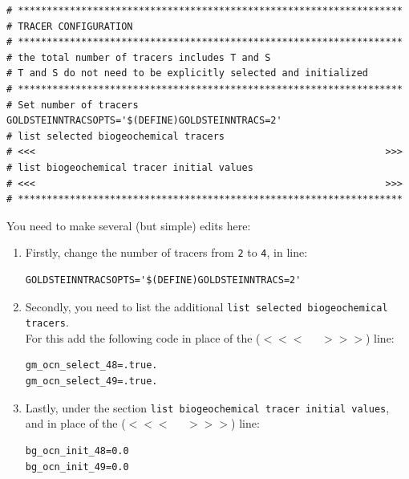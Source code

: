 \documentclass[11pt,fleqn]{book} %
\begin{document}
\footnotesize\vspace{-2pt}\begin{verbatim}
# *******************************************************************
# TRACER CONFIGURATION
# *******************************************************************
# the total number of tracers includes T and S
# T and S do not need to be explicitly selected and initialized
# *******************************************************************
# Set number of tracers
GOLDSTEINNTRACSOPTS='$(DEFINE)GOLDSTEINNTRACS=2'
# list selected biogeochemical tracers
# <<<                                                             >>>
# list biogeochemical tracer initial values
# <<<                                                             >>>
# *******************************************************************
\end{verbatim}\vspace{-2pt}\normalsize

\noindent You need to make several (but simple) edits here:

\vspace{4pt}
\begin{enumerate}
\item Firstly, change the number of tracers from \texttt{2} to \texttt{4}, in line:
\small\vspace{-2pt}\begin{verbatim}
GOLDSTEINNTRACSOPTS='$(DEFINE)GOLDSTEINNTRACS=2'
\end{verbatim}\vspace{-2pt}\normalsize
\item Secondly, you need to list the additional \texttt{list selected biogeochemical tracers}.
\\For this add the following code in place of the (\(<<<\;\;\;\;\;>>>\)) line:
\small\vspace{-2pt}\begin{verbatim}
gm_ocn_select_48=.true.
gm_ocn_select_49=.true.
\end{verbatim}\vspace{-2pt}\normalsize
\item Lastly, under the section \texttt{list biogeochemical tracer initial values}, and in place of the (\(<<<\;\;\;\;\;>>>\)) line:
\small\vspace{-2pt}\begin{verbatim}
bg_ocn_init_48=0.0
bg_ocn_init_49=0.0
\end{verbatim}\vspace{-2pt}\normalsize
\end{enumerate}
\end{document}
